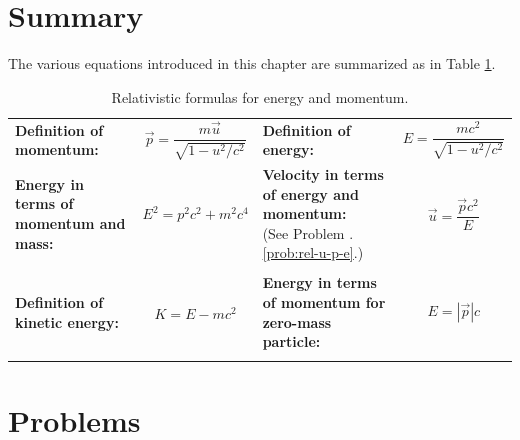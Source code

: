 \section{Summary}
The various equations introduced in this chapter are summarized as
in Table \ref{table:rel-defs}.

\begin{table}[h]
\caption{Relativistic formulas for energy and momentum.}
\label{table:rel-defs}
\begin{tabular}{|lclc|} \hline
\parbox{3.0cm}{\textbf{Definition of momentum:}}   &  
       \parbox{3.cm}{\[ \vec p =\frac{m\vec u}{\sqrt{1-u^2/c^2}} \]} & 
\parbox{3.0cm}{\textbf{Definition of energy:}} & 
       \parbox{3.cm}{\[ E =\frac{mc^2}{\sqrt{1-u^2/c^2}} \]} \\
\parbox{3.0cm}{ \textbf{Energy in terms of momentum and mass:}}   &  
       \parbox{3.cm}{\[ E^2 = p^2c^2 + m^2c^4\]} & 
\parbox{3.0cm}{\textbf{Velocity in terms of energy and momentum:}\\
       (See Problem .\ref{prob:rel-u-p-e}.)} & 
       \parbox{3.cm}{\[ \vec{u} = \frac{\vec{p}c^2}{E} \]} \\
       & & & \\
\parbox{3.0cm}{\textbf{Definition of kinetic energy:}}   &  
       \parbox{3.cm}{\[ K = E - mc^2 \]} & 
\parbox{3.0cm}{\textbf{Energy in terms of momentum for 
zero-mass particle:}} & 
       \parbox{3.cm}{\[ E = \left|\vec{p}\right|c \]} \\
&  & & \\ \hline
\end{tabular}
\end{table}



\section*{Problems}

